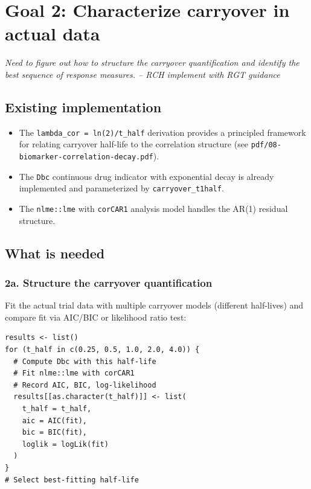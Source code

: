 \documentclass[11pt]{article}
\begin{document}
\section{Goal 2: Characterize carryover in actual data}

\textit{Need to figure out how to structure the carryover
quantification and identify the best sequence of response
measures. -- RCH implement with RGT guidance}

\subsection{Existing implementation}

\begin{itemize}
  \item The \texttt{lambda\_cor = ln(2)/t\_half} derivation provides a
    principled framework for relating carryover half-life to
    the correlation structure (see
    \texttt{pdf/08-biomarker-correlation-decay.pdf}).
  \item The \texttt{Dbc} continuous drug indicator with exponential decay
    is already implemented and parameterized by
    \texttt{carryover\_t1half}.
  \item The \texttt{nlme::lme} with \texttt{corCAR1} analysis model handles the
    AR(1) residual structure.
\end{itemize}

\subsection{What is needed}

\subsubsection{2a. Structure the carryover quantification}

Fit the actual trial data with multiple carryover models
(different half-lives) and compare fit via AIC/BIC or
likelihood ratio test:

\begin{lstlisting}
results <- list()
for (t_half in c(0.25, 0.5, 1.0, 2.0, 4.0)) {
  # Compute Dbc with this half-life
  # Fit nlme::lme with corCAR1
  # Record AIC, BIC, log-likelihood
  results[[as.character(t_half)]] <- list(
    t_half = t_half,
    aic = AIC(fit),
    bic = BIC(fit),
    loglik = logLik(fit)
  )
}
# Select best-fitting half-life
\end{lstlisting}
\end{document}
